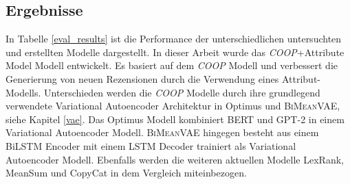 


\subsection{Ergebnisse}
\label{eval_results_chapter}
In Tabelle \ref{eval_results} ist die Performance der unterschiedlichen untersuchten und erstellten Modelle dargestellt.
In dieser Arbeit wurde das \glqq \textit{COOP}+Attribute Model\grqq{} Modell entwickelt.
Es basiert auf dem \textit{COOP} Modell und verbessert die Generierung von neuen Rezensionen durch die Verwendung eines Attribut-Modells.
Unterschieden werden die \textit{COOP} Modelle durch ihre grundlegend verwendete Variational Autoencoder Architektur in Optimus und \textsc{BiMeanVAE}, siehe Kapitel \ref{vae}.
Das Optimus Modell kombiniert BERT und GPT-2 in einem Variational Autoencoder Modell. \textsc{BiMeanVAE} hingegen besteht aus einem BiLSTM Encoder mit einem LSTM Decoder trainiert als Variational Autoencoder Modell.
Ebenfalls werden die weiteren aktuellen Modelle LexRank, MeanSum und CopyCat in dem Vergleich miteinbezogen.


